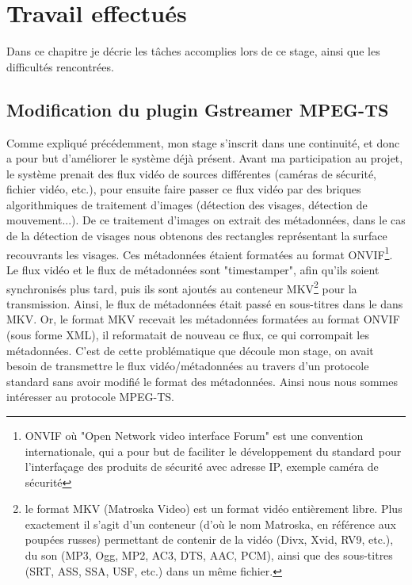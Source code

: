 \chapter{Travail effectués}
Dans ce chapitre je décrie les tâches accomplies lors de ce stage, ainsi que les difficultés rencontrées.
\section{Modification du plugin Gstreamer MPEG-TS}
Comme expliqué précédemment, mon stage s’inscrit dans une continuité, et donc a pour but d'améliorer le système déjà présent. Avant ma participation au projet, le système prenait des flux vidéo de sources différentes (caméras de sécurité, fichier vidéo, etc.), pour ensuite faire passer ce flux vidéo par des briques algorithmiques de traitement d'images (détection des visages, détection de mouvement...). De ce traitement d'images on extrait des métadonnées, dans le cas de la détection de visages nous obtenons des rectangles représentant la surface recouvrants les visages. Ces métadonnées étaient formatées au format ONVIF\footnote{ONVIF où "Open Network video interface Forum" est une convention internationale, qui a pour but de faciliter le développement du standard pour l'interfaçage des produits de sécurité avec adresse IP, exemple caméra de sécurité}. Le flux vidéo et le flux de métadonnées sont "timestamper", afin qu'ils soient synchronisés plus tard, puis ils sont ajoutés au conteneur MKV\footnote{le format MKV (Matroska Video) est un format vidéo entièrement libre. Plus exactement il s'agit d'un conteneur (d'où le nom Matroska, en référence aux poupées russes) permettant de contenir de la vidéo (Divx, Xvid, RV9, etc.), du son (MP3, Ogg, MP2, AC3, DTS, AAC, PCM), ainsi que des sous-titres (SRT, ASS, SSA, USF, etc.) dans un même fichier.} pour la transmission. Ainsi, le flux de métadonnées était passé en sous-titres dans le dans MKV. Or, le format MKV recevait les métadonnées formatées au format ONVIF (sous forme XML), il reformatait de nouveau ce flux, ce qui corrompait les métadonnées. C'est de cette problématique que découle mon stage, on avait besoin de transmettre le flux vidéo/métadonnées au travers d'un protocole standard sans avoir modifié le format des métadonnées. Ainsi nous nous sommes intéresser au protocole MPEG-TS.

